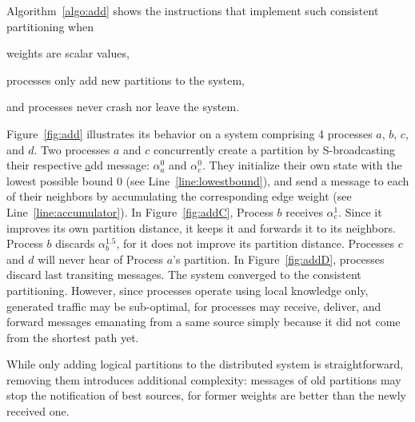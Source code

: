 Algorithm~\ref{algo:add} shows the instructions that implement such
consistent partitioning when
\begin{inparaenum}[(i)]
\item weights are scalar values,
\item processes only add new partitions to the system,
\item and processes never crash nor leave the system.
\end{inparaenum}
 Figure~\ref{fig:add} illustrates its behavior on a system comprising
 4 processes $a$, $b$, $c$, and $d$. Two processes $a$ and $c$
 concurrently create a partition by S-broadcasting their respective
 \underline{a}dd message: $\alpha_a^0$ and $\alpha_c^0$. They
 initialize their own state with the lowest possible bound $0$ (see
 Line~\ref{line:lowestbound}), and send a message to each of their
 neighbors by accumulating the corresponding edge weight (see
 Line~\ref{line:accumulator}). In Figure~\ref{fig:addC}, Process $b$
 receives $\alpha_{c}^{1}$. Since it improves its own partition
 distance, it keeps it and forwards it to its neighbors. Process $b$
 discards $\alpha_{b}^{1.5}$, for it does not improve its partition
 distance. Processes $c$ and $d$ will never hear of Process $a$'s
 partition.  In Figure~\ref{fig:addD}, processes discard last
 transiting messages. The system converged to the consistent
 partitioning. However, since processes operate using local knowledge
 only, generated traffic may be sub-optimal, for processes may
 receive, deliver, and forward messages emanating from a same source
 simply because it did not come from the shortest path yet.



While only adding logical partitions to the distributed system is
straightforward, removing them introduces additional complexity:
messages of old partitions may stop the notification of best sources,
for former weights are better than the newly received one. 

